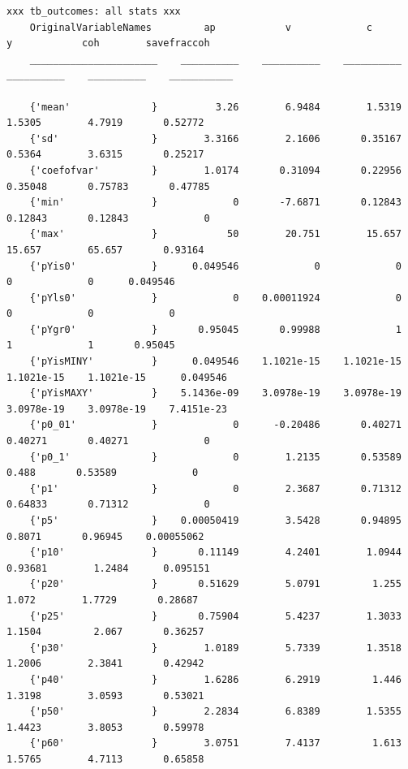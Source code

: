 \documentclass[
]{book}
\begin{document}
\begin{verbatim}
xxx tb_outcomes: all stats xxx
    OriginalVariableNames         ap            v             c             y            coh        savefraccoh
    ______________________    __________    __________    __________    __________    __________    ___________

    {'mean'              }          3.26        6.9484        1.5319        1.5305        4.7919       0.52772 
    {'sd'                }        3.3166        2.1606       0.35167        0.5364        3.6315       0.25217 
    {'coefofvar'         }        1.0174       0.31094       0.22956       0.35048       0.75783       0.47785 
    {'min'               }             0       -7.6871       0.12843       0.12843       0.12843             0 
    {'max'               }            50        20.751        15.657        15.657        65.657       0.93164 
    {'pYis0'             }      0.049546             0             0             0             0      0.049546 
    {'pYls0'             }             0    0.00011924             0             0             0             0 
    {'pYgr0'             }       0.95045       0.99988             1             1             1       0.95045 
    {'pYisMINY'          }      0.049546    1.1021e-15    1.1021e-15    1.1021e-15    1.1021e-15      0.049546 
    {'pYisMAXY'          }    5.1436e-09    3.0978e-19    3.0978e-19    3.0978e-19    3.0978e-19    7.4151e-23 
    {'p0_01'             }             0      -0.20486       0.40271       0.40271       0.40271             0 
    {'p0_1'              }             0        1.2135       0.53589         0.488       0.53589             0 
    {'p1'                }             0        2.3687       0.71312       0.64833       0.71312             0 
    {'p5'                }    0.00050419        3.5428       0.94895        0.8071       0.96945    0.00055062 
    {'p10'               }       0.11149        4.2401        1.0944       0.93681        1.2484      0.095151 
    {'p20'               }       0.51629        5.0791         1.255         1.072        1.7729       0.28687 
    {'p25'               }       0.75904        5.4237        1.3033        1.1504         2.067       0.36257 
    {'p30'               }        1.0189        5.7339        1.3518        1.2006        2.3841       0.42942 
    {'p40'               }        1.6286        6.2919         1.446        1.3198        3.0593       0.53021 
    {'p50'               }        2.2834        6.8389        1.5355        1.4423        3.8053       0.59978 
    {'p60'               }        3.0751        7.4137         1.613        1.5765        4.7113       0.65858 

\end{verbatim}
\end{document}
